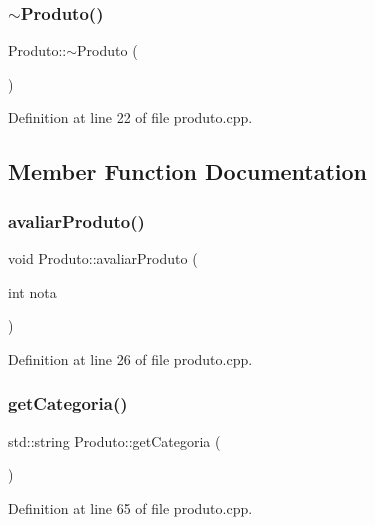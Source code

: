 \subsubsection{\texorpdfstring{$\sim$\+Produto()}{~Produto()}}
{\footnotesize\ttfamily Produto\+::$\sim$\+Produto (\begin{DoxyParamCaption}{ }\end{DoxyParamCaption})}



Definition at line 22 of file produto.\+cpp.



\subsection{Member Function Documentation}
\mbox{\label{class_produto_ab09e6f36f81eb4545ce91dfc14f017b7}} 
\subsubsection{\texorpdfstring{avaliar\+Produto()}{avaliarProduto()}}
{\footnotesize\ttfamily void Produto\+::avaliar\+Produto (\begin{DoxyParamCaption}\item[{int}]{nota }\end{DoxyParamCaption})}



Definition at line 26 of file produto.\+cpp.

\mbox{\label{class_produto_a58d6d63dbadf2c8f579acabcf740a5ca}} 
\subsubsection{\texorpdfstring{get\+Categoria()}{getCategoria()}}
{\footnotesize\ttfamily std\+::string Produto\+::get\+Categoria (\begin{DoxyParamCaption}{ }\end{DoxyParamCaption})}



Definition at line 65 of file produto.\+cpp.

\mbox{\label{class_produto_a8851122041c0591171bd6ca27661b1b5}} 
